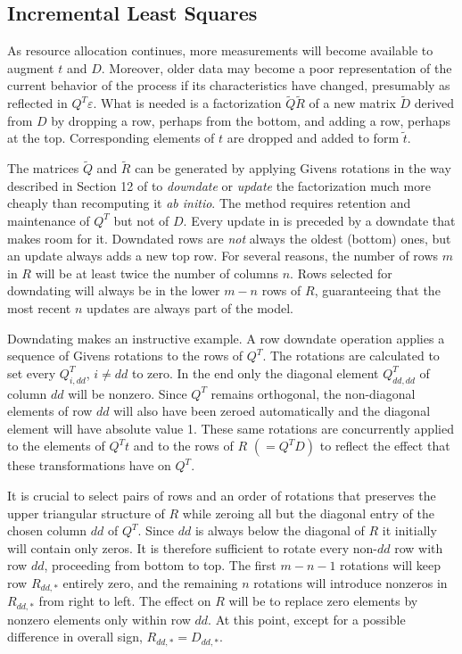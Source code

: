 \subsection*{Incremental Least Squares}

As resource allocation continues, more measurements will become available to augment $t$ and $D$.
Moreover, older data may become a poor representation of the current behavior of the process if its characteristics have changed,
presumably as reflected in $Q^T\varepsilon$.
What is needed is a factorization $\tilde{Q}\tilde{R}$ of a new matrix $\tilde{D}$
derived from $D$ by dropping a row, perhaps from the bottom,
and adding a row, perhaps at the top.
Corresponding elements of $t$ are dropped and added to form $\tilde{t}$.

The matrices $\tilde{Q}$ and $\tilde{R}$ can be generated by applying Givens rotations
in the way described in Section 12 of \cite{GoVL} to \emph{downdate} or \emph{update} the factorization
much more cheaply than recomputing it \emph{ab initio}.
The method requires retention and maintenance of $Q^T$ but not of $D$.
Every update in \pacora is preceded by a downdate that makes room for it.
Downdated rows are \emph{not} always the oldest (bottom) ones, but
an update always adds a new top row.
For several reasons, the number of rows $m$ in $R$
will be at least twice the number of columns $n$.
Rows selected for downdating will always be in the lower $m - n$ rows of $R$,
guaranteeing that the most recent $n$ updates are always part of the model.

Downdating makes an instructive example. A row downdate operation applies
a sequence of Givens rotations to the rows of $Q^T$.
The rotations are calculated to set every $Q^T_{i,dd}$, $i \neq dd$ to zero.
In the end only the diagonal element $Q^T_{dd,dd}$ of column $dd$ will be nonzero.
Since $Q^T$ remains orthogonal, the non-diagonal elements of row $dd$ will also have been zeroed automatically
and the diagonal element will have absolute value 1.
These same rotations are concurrently applied to the elements of $Q^T t$ and to the rows of $R$ $(= Q^T D)$
to reflect the effect that these transformations have on $Q^T$.

It is crucial to select pairs of rows and an order of rotations that preserves the upper triangular structure of $R$
while zeroing all but the diagonal entry of the chosen column $dd$ of $Q^T$.
Since $dd$ is always below the diagonal of $R$ it initially will contain only zeros.
It is therefore sufficient to rotate every non-$dd$ row with row $dd$, proceeding from bottom to top.
The first $m - n - 1$ rotations will keep row $R_{dd,*}$ entirely zero,
and the remaining $n$ rotations will introduce nonzeros in $R_{dd,*}$ from right to left.
The effect on $R$ will be to replace zero elements by nonzero elements only within row $dd$.
At this point, except for a possible difference in overall sign, $R_{dd,*} = D_{dd,*}$.

